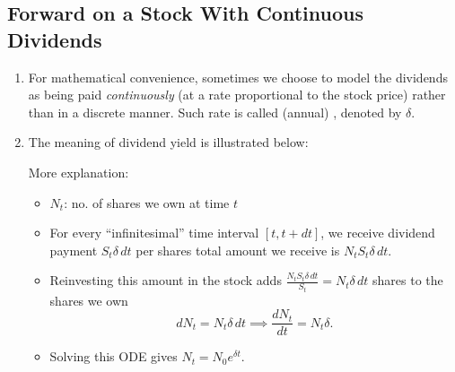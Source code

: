 \subsection{Forward on a Stock With Continuous Dividends}
\begin{enumerate}
\item For mathematical convenience, sometimes we choose to model the dividends
as being paid \emph{continuously} (at a rate proportional to the stock price)
rather than in a discrete manner. Such rate is called (annual) , denoted by \(\delta\).
\item The meaning of dividend yield is illustrated below:
\begin{center}
\end{center}
More explanation:
\begin{itemize}
\item \(N_t\): no. of  shares we own at time \(t\)
\item For every ``infinitesimal'' time interval \([t,t+dt]\), we receive
dividend payment  \(S_{t}\delta\,dt\) per shares
 total amount we receive is \(N_tS_t\delta\,dt\).
\item Reinvesting this amount in the stock  adds
\(\displaystyle \frac{N_tS_t\delta\,dt}{S_t}=N_t\delta\,dt\) 
shares to the shares we own 
\[dN_t=N_t\delta\,dt \implies
\frac{dN_t}{dt}=N_t\delta.\]
\item Solving this ODE gives \(N_t=N_0e^{\delta t}\).
\end{itemize}
\begin{note}

\end{note}
\end{enumerate}
